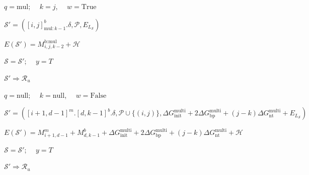 \documentclass[11pt,letterpaper]{article}  \usepackage[margin=1in]{geometry}
\theoremstyle{definition}  \newtheorem{Definition}[theorem]{Definition}
\begin{document}
\begin{algorithm}
\begin{algorithmic}[1]
		
		\State $q = \text{mul}$; \ \ $k = j$, \ \ $w= \mathrm{True}$
		\EndIf	
		
		
		\State $\mathcal{S}' = ([i,j]^b_{\text{mul}:k-1}.\delta, \mathcal{P}, E_{L_{\mathcal{S}}})$ 
		
		\State $E(\mathcal{S}')  = M_{i,j,k-2}^\text{b:mul} + \mathcal{H}$
		
		
		
		
		\State $\mathcal{S} = \mathcal{S}'$; \ \  $y = T$
		
		\Else
		
		\State $\mathcal{S}' \Rightarrow \mathcal{R}_u$		
		\EndIf
		
		\EndIf
		
		\EndIf
		\State $q = \text{null}$; \ \ $k = \text{null}$, \ \ $w= \mathrm{False}$ 
		\EndIf	
		
		
		
		
		
		\State  $\mathcal{S}' = ([i+1,d-1]^m.[d,k-1]^b.\delta, \mathcal{P} \cup \{(i,j)\}, \Delta G_\text{init}^\text{multi} + 2\Delta G_\text{bp}^\text{multi} + (j-k) \Delta G_\text{nt}^\text{multi} + E_{L_{\mathcal{S}}})$
		
		\State $E(\mathcal{S}')  = M^m_{i+1,d-1} + M^b_{d,k-1} + \Delta G_\text{init}^\text{multi} + 2\Delta G_\text{bp}^\text{multi} + (j-k)\Delta G_\text{nt}^\text{multi} + \mathcal{H}$
		
		
		
		
		\State $\mathcal{S} = \mathcal{S}'$; \ \  $y = T$
		
		\Else
		
		\State $\mathcal{S}' \Rightarrow \mathcal{R}_u$		
		\EndIf
		
		
		\EndIf
		\EndFor
		\EndIf
		
		
		
		
		
	\end{algorithmic}
\end{algorithm}
\end{document}
